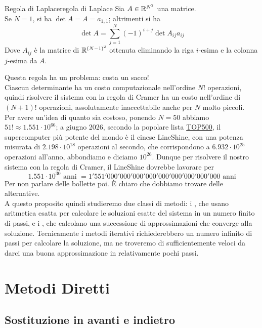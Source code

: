 \documentclass[openany]{book}
\begin{document}
\begin{proposition}{Regola di Laplace}{regola di Laplace}
    Sia $A \in \mathbb{R}^{N^2}$ una matrice.\\
    Se $N=1$, si ha $\det A = A = a_{1,1}$; altrimenti si ha 
    \[\det A = \sum_{j=1}^N (-1)^{i+j}\det A_{ij}a_{ij}\]
    Dove $A_{ij}$ è la matrice di $\mathbb{R}^{(N-1)^2}$ ottenuta eliminando la riga $i$-esima e la colonna $j$-esima da $A$.
\end{proposition}

Questa regola ha un problema: costa un sacco!\\
Ciascun determinante ha un costo computazionale nell'ordine $N!$ operazioni, quindi risolvere il sistema con la regola di Cramer ha un costo nell'ordine di $(N+1)!$ operazioni, assolutamente inaccettabile anche per $N$ molto piccoli.\\
Per avere un'idea di quanto sia costoso, ponendo $N=50$ abbiamo $51!\approx 1.551\cdot 10^{66}$; a giugno 2026, secondo la popolare lista \href{https://top500.org/lists/top500/2026/06/}{TOP500},  il supercomputer più potente del mondo è il cinese LineShine, con una potenza misurata di $2.198\cdot 10^{18}$ operazioni al secondo, che corrispondono a $6.932\cdot 10^{25}$ operazioni all'anno, abbondiamo e diciamo $10^{26}$. Dunque per risolvere il nostro sistema con la regola di Cramer, il LineShine dovrebbe lavorare per 
\[ 1.551\cdot 10^{30} \text{ anni } = 1'551'000'000'000'000'000'000'000'000'000 \text{ anni}\]
Per non parlare delle bollette poi. È chiaro che dobbiamo trovare delle alternative.\\
A questo proposito quindi studieremo due classi di metodi: i , che usano aritmetica esatta per calcolare le soluzioni esatte del sistema in un numero finito di passi, e i , che calcolano una successione di approssimazioni che converge alla soluzione. Tecnicamente i metodi iterativi richiederebbero un numero infinito di passi per calcolare la soluzione, ma ne troveremo di sufficientemente veloci da darci una buona approssimazione in relativamente pochi passi.

\newpage
\section{Metodi Diretti}

\subsection{Sostituzione in avanti e indietro}
\end{document}
